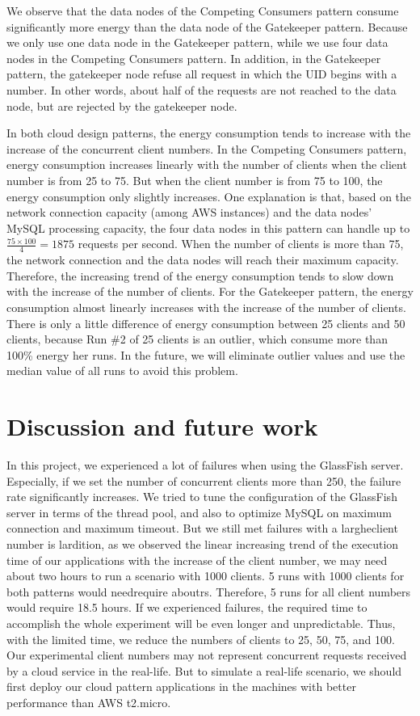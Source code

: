 \documentclass{article}
\begin{document}
We observe that the data nodes of the Competing Consumers pattern consume significantly more energy than the data node of the Gatekeeper pattern. Because we only use one data node in the Gatekeeper pattern, while we use four data nodes in the Competing Consumers pattern. In addition, in the Gatekeeper pattern, the gatekeeper node refuse all request in which the UID begins with a number. In other words, about half of the requests are not reached to the data node, but are rejected by the gatekeeper node.

In both cloud design patterns, the energy consumption tends to increase with the increase of the concurrent client numbers. In the Competing Consumers pattern, energy consumption increases linearly with the number of clients when the client number is from 25 to 75. But when the client number is from 75 to 100, the energy consumption only slightly increases. One explanation is that, based on the network connection capacity (among AWS instances) and the data nodes' MySQL processing capacity, the four data nodes in this pattern can handle up to $\frac{75\times100}{4}=1875$ requests per second. When the number of clients is more than 75, the network connection and the data nodes will reach their maximum capacity. Therefore, the increasing trend of the energy consumption tends to slow down with the increase of the number of clients. For the Gatekeeper pattern, the energy consumption almost linearly increases with the increase of the number of clients. There is only a little difference of energy consumption between 25 clients and 50 clients, because Run \#2 of 25 clients is an outlier, which consume more than 100\% energy her runs. In the future, we will eliminate outlier values and use the median value of all runs to avoid this problem.

\section{Discussion and future work}
In this project, we experienced a lot of failures when using the GlassFish server. Especially, if we set the number of concurrent clients more than 250, the failure rate significantly increases. We tried to tune the configuration of the GlassFish server in terms of the thread pool, and also to optimize MySQL on maximum connection and maximum timeout. But we still met failures with a largheclient number is lardition, as we observed the linear increasing trend of the execution time of our applications with the increase of the client number, we may need about two hours to run a scenario with 1000 clients. 5 runs with 1000 clients for both patterns would needrequire aboutrs. Therefore, 5 runs for all client numbers would require 18.5 hours. If we experienced failures, the required time to accomplish the whole experiment will be even longer and unpredictable. Thus, with the limited time, we reduce the numbers of clients to 25, 50, 75, and 100. Our experimental client numbers may not represent concurrent requests received by a cloud service in the real-life. But to simulate a real-life scenario, we should first deploy our cloud pattern applications in the machines with better performance than AWS t2.micro. \\
\end{document}
